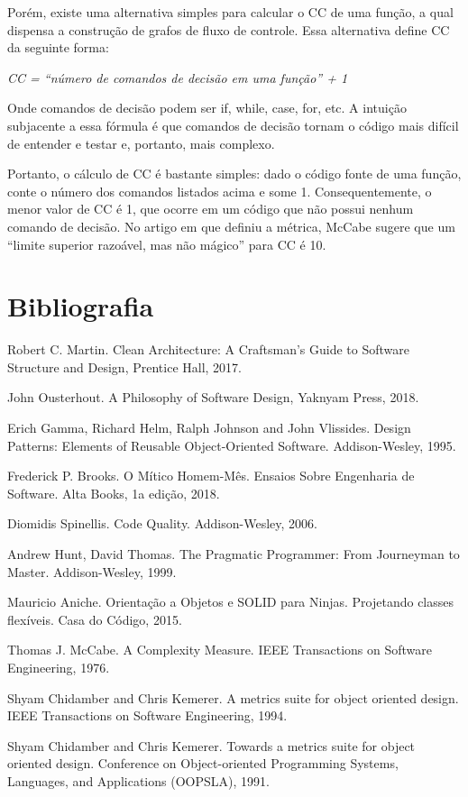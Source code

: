 \documentclass[
  11pt,
  twoside]{book}
\begin{document}
Porém, existe uma alternativa simples para calcular o CC de uma função,
a qual dispensa a construção de grafos de fluxo de controle. Essa
alternativa define CC da seguinte forma:

\emph{CC = ``número de comandos de decisão em uma função'' + 1}

Onde comandos de decisão podem ser if, while, case, for, etc. A intuição
subjacente a essa fórmula é que comandos de decisão tornam o código mais
difícil de entender e testar e, portanto, mais complexo.

Portanto, o cálculo de CC é bastante simples: dado o código fonte de uma
função, conte o número dos comandos listados acima e some 1.
Consequentemente, o menor valor de CC é 1, que ocorre em um código que
não possui nenhum comando de decisão. No artigo em que definiu a
métrica, McCabe sugere que um ``limite superior razoável, mas não
mágico'' para CC é 10.

\hypertarget{bibliografia-4}{%
\section*{Bibliografia}\label{bibliografia-4}}

Robert C. Martin. Clean Architecture: A Craftsman's Guide to Software
Structure and Design, Prentice Hall, 2017.

John Ousterhout. A Philosophy of Software Design, Yaknyam Press, 2018.

Erich Gamma, Richard Helm, Ralph Johnson and John Vlissides. Design
Patterns: Elements of Reusable Object-Oriented Software. Addison-Wesley,
1995.

Frederick P. Brooks. O Mítico Homem-Mês. Ensaios Sobre Engenharia de
Software. Alta Books, 1a edição, 2018.

Diomidis Spinellis. Code Quality. Addison-Wesley, 2006.

Andrew Hunt, David Thomas. The Pragmatic Programmer: From Journeyman to
Master. Addison-Wesley, 1999.

Mauricio Aniche. Orientação a Objetos e SOLID para Ninjas. Projetando
classes flexíveis. Casa do Código, 2015.

Thomas J. McCabe. A Complexity Measure. IEEE Transactions on Software
Engineering, 1976.

Shyam Chidamber and Chris Kemerer. A metrics suite for object oriented
design. IEEE Transactions on Software Engineering, 1994.

Shyam Chidamber and Chris Kemerer. Towards a metrics suite for object
oriented design. Conference on Object-oriented Programming Systems,
Languages, and Applications (OOPSLA), 1991.
\end{document}
